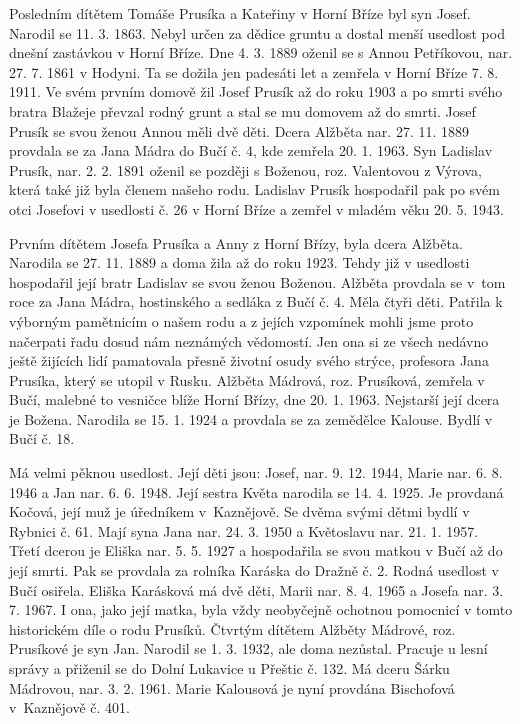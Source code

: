 \documentclass[../dejiny-rodu-prusiku.tex]{subfiles}
\begin{document}
Posledním dítětem Tomáše Prusíka a Kateřiny v Horní Bříze byl syn Josef. Narodil se 11. 3. 1863. Nebyl určen za dědice gruntu a dostal menší usedlost pod dnešní zastávkou v Horní Bříze. Dne 4. 3. 1889 oženil se s Annou Petříkovou, nar. 27. 7. 1861 v Hodyni. Ta se dožila jen padesáti let a zemřela v Horní Bříze 7. 8. 1911. Ve svém prvním domově žil Josef Prusík až do roku 1903 a po smrti svého bratra Blažeje převzal rodný grunt a stal se mu domo­vem až do smrti. Josef Prusík se svou ženou Annou měli dvě děti. Dcera Alžběta nar. 27. 11. 1889 provdala se za Jana Mádra do Bučí č. 4, kde zemřela 20. 1. 1963. Syn Ladislav Prusík, nar. 2. 2. 1891 oženil se později s Boženou, roz. Valentovou z Výrova, která také již byla členem našeho rodu. Ladislav Prusík hospodařil pak po svém otci Josefovi v usedlosti č. 26 v Horní Bříze a zemřel v mladém věku 20. 5. 1943.

Prvním dítětem Josefa Prusíka a Anny z Horní Břízy, byla dcera Alžběta. Narodila se 27. 11. 1889 a doma žila až do roku 1923. Tehdy již v usedlosti hospodařil její bratr Ladislav se svou ženou Boženou. Alžběta provdala se v tom roce za Jana Mádra, hostinského a sedláka z Bučí č. 4. Měla čtyři děti. Patřila k výborným pamětnicím o našem rodu a z jejích vzpomínek mohli jsme proto načerpati řadu dosud nám neznámých vědomostí. Jen ona si ze všech nedávno ještě žijících lidí pamatovala přesně životní osudy svého strýce, profesora Jana Prusíka, který se utopil v Rusku. Alžběta Mádrová, roz. Prusíková, zemřela v Bučí, malebné to vesničce blíže Horní Břízy, dne 20. 1. 1963.
Nejstarší její dcera je Božena. Narodila se 15. 1. 1924 a provdala se za zemědělce Kalouse. Bydlí v Bučí č. 18.

Má velmi pěknou usedlost. Její děti jsou: Josef, nar. 9. 12. 1944, Marie nar. 6. 8. 1946 a Jan nar. 6. 6. 1948. Její sestra Květa narodila se 14. 4. 1925. Je provdaná Kočová, její muž je úředníkem v Kaznějově. Se dvěma svými dětmi bydlí v Rybnici č. 61. Mají syna Jana nar. 24. 3. 1950 a Květoslavu nar. 21. 1. 1957.  Třetí dcerou je Eliška nar. 5. 5. 1927 a hospodařila se svou matkou v Bučí až do její smrti. Pak se provdala za rolníka Karáska do Dražně č. 2. Rodná usedlost v Bučí osiřela. Eliška Karásková má dvě děti, Marii nar. 8. 4. 1965 a Josefa nar. 3. 7. 1967. I ona, jako její matka, byla vždy neobyčejně ochotnou pomocnicí v tomto historickém díle o rodu Prusíků. Čtvrtým dítětem Alžběty Mádrové, roz. Prusíkové je syn Jan. Narodil se 1. 3. 1932, ale doma nezůstal. Pracuje u lesní správy a přiženil se do Dolní Lukavice u Přeštic č. 132. Má dceru Šárku Mádrovou, nar. 3. 2. 1961. Marie Kalousová je nyní provdána Bischofová v Kaznějově č. 401.
\end{document}
